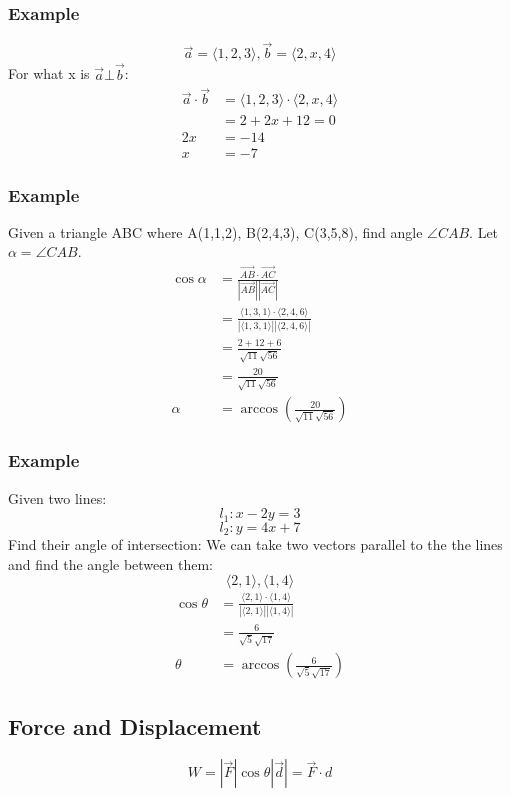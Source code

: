\documentclass[letterpaper, 12pt]{math}
\begin{document}
\subsubsection*{Example}
\[ \vec{a} = \langle1,2,3\rangle, \vec{b} = \langle2,x,4\rangle \]
For what x is \( \vec{a}\bot\vec{b} \):
\begin{align*}
  \vec{a}\cdot\vec{b} &= \langle1,2,3\rangle\cdot\langle2,x,4\rangle \\
  &= 2+2x+12 = 0 \\
  2x &= -14 \\
  x &= -7
\end{align*}

\subsubsection*{Example}
Given a triangle ABC where A(1,1,2), B(2,4,3), C(3,5,8), find angle
\( \angle CAB \). Let \( \alpha = \angle CAB \).
\begin{align*}
  \cos\alpha &= \frac{\overrightarrow{AB}\cdot\overrightarrow{AC}}
  {|\overrightarrow{AB}||\overrightarrow{AC}|} \\
  &= \frac{\langle1,3,1\rangle\cdot\langle2,4,6\rangle}
    {|\langle1,3,1\rangle||\langle2,4,6\rangle|} \\
  &= \frac{2+12+6}{\sqrt{11}\sqrt{56}} \\
  &= \frac{20}{\sqrt{11}\sqrt{56}} \\
  \alpha &= \arccos(\frac{20}{\sqrt{11}\sqrt{56}})
\end{align*}

\subsubsection*{Example}
Given two lines:
\[ l_{1}: x-2y = 3 \]
\[ l_{2}: y = 4x+7 \]
Find their angle of intersection:
We can take two vectors parallel to the the lines and find the angle between
them:
\[ \langle2,1\rangle, \langle1,4\rangle \]
\begin{align*}
  \cos\theta &= \frac{\langle2,1\rangle\cdot\langle1,4\rangle}
    {|\langle2,1\rangle||\langle1,4\rangle|} \\
  &= \frac{6}{\sqrt{5}\sqrt{17}} \\
  \theta &= \arccos(\frac{6}{\sqrt{5}\sqrt{17}})
\end{align*}

\subsection*{Force and Displacement}
\begin{center}
\end{center}
\[ W = |\vec{F}|\cos\theta|\vec{d}| = \vec{F}\cdot{d} \]
\end{document}
